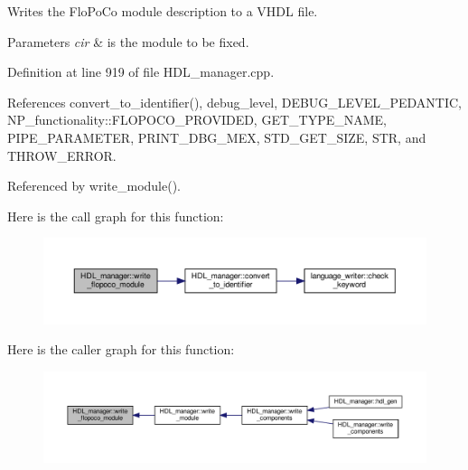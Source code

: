 Writes the Flo\+Po\+Co module description to a V\+H\+DL file. 


\begin{DoxyParams}{Parameters}
{\em cir} & is the module to be fixed. \\
\hline
\end{DoxyParams}


Definition at line 919 of file H\+D\+L\+\_\+manager.\+cpp.



References convert\+\_\+to\+\_\+identifier(), debug\+\_\+level, D\+E\+B\+U\+G\+\_\+\+L\+E\+V\+E\+L\+\_\+\+P\+E\+D\+A\+N\+T\+IC, N\+P\+\_\+functionality\+::\+F\+L\+O\+P\+O\+C\+O\+\_\+\+P\+R\+O\+V\+I\+D\+ED, G\+E\+T\+\_\+\+T\+Y\+P\+E\+\_\+\+N\+A\+ME, P\+I\+P\+E\+\_\+\+P\+A\+R\+A\+M\+E\+T\+ER, P\+R\+I\+N\+T\+\_\+\+D\+B\+G\+\_\+\+M\+EX, S\+T\+D\+\_\+\+G\+E\+T\+\_\+\+S\+I\+ZE, S\+TR, and T\+H\+R\+O\+W\+\_\+\+E\+R\+R\+OR.



Referenced by write\+\_\+module().

Here is the call graph for this function\+:
\nopagebreak
\begin{figure}[H]
\begin{center}
\leavevmode
\includegraphics[width=350pt]{d7/d32/classHDL__manager_aea3affebb889f7cdfbcbf62a6473b9b2_cgraph}
\end{center}
\end{figure}
Here is the caller graph for this function\+:
\nopagebreak
\begin{figure}[H]
\begin{center}
\leavevmode
\includegraphics[width=350pt]{d7/d32/classHDL__manager_aea3affebb889f7cdfbcbf62a6473b9b2_icgraph}
\end{center}
\end{figure}
\mbox{\label{classHDL__manager_a87ef5b67f3ed867fff727d9b3f161795}} 
